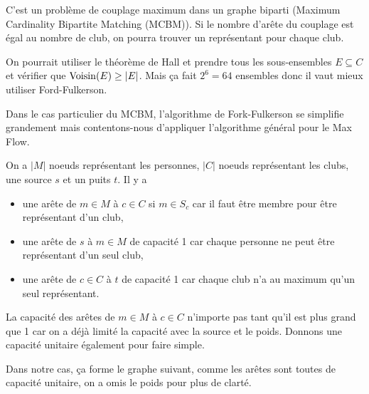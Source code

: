 \begin{solution}
  C'est un problème de couplage maximum dans un graphe biparti (Maximum Cardinality Bipartite Matching (MCBM)).
  Si le nombre d'arête du couplage est égal au nombre de club,
  on pourra trouver un représentant pour chaque club.

  On pourrait utiliser le théorème de Hall et prendre tous les sous-ensembles $E \subseteq C$
  et vérifier que $\operatorname{Voisin}(E) \geq |E|$.
  Mais ça fait $2^6 = 64$ ensembles donc il vaut mieux utiliser Ford-Fulkerson.

  Dans le cas particulier du MCBM,
  l'algorithme de Fork-Fulkerson se simplifie grandement mais contentons-nous d'appliquer l'algorithme
  général pour le Max Flow.

  On a $|M|$ noeuds représentant les personnes,
  $|C|$ noeuds représentant les clubs, une source $s$ et un puits $t$.
  Il y a
  \begin{itemize}
    \item une arête de $m \in M$ à $c \in C$ si $m \in S_c$ car il faut être membre pour être représentant d'un club,
    \item une arête de $s$ à $m \in M$ de capacité 1 car chaque personne ne peut être représentant d'un seul club,
    \item une arête de $c \in C$ à $t$ de capacité 1 car chaque club n'a au maximum qu'un seul représentant.
  \end{itemize}
  La capacité des arêtes de $m \in M$ à $c \in C$ n'importe pas tant qu'il est plus grand que 1
  car on a déjà limité la capacité avec la source et le poids.
  Donnons une capacité unitaire également pour faire simple.

  Dans notre cas, ça forme le graphe suivant,
  comme les arêtes sont toutes de capacité unitaire,
  on a omis le poids pour plus de clarté.
  \begin{center}
  \end{center}


\end{solution}
